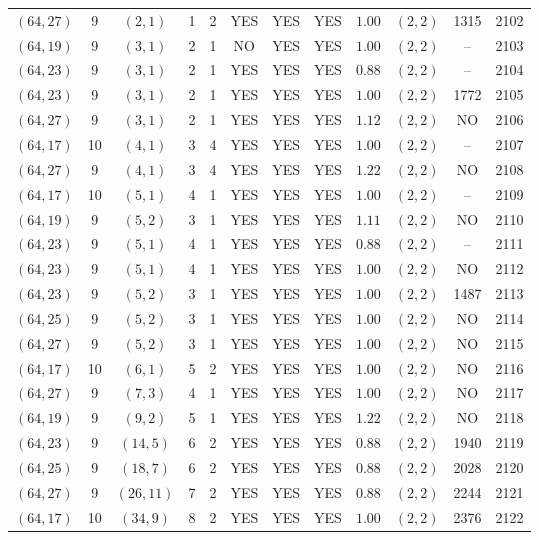 \begin{longtable}{|c|c|c|c|c|c|c|c|c|c|c|c|}
$(64,27)$ & 9 & $(2,1)$ & 1 & 2 & YES & YES & YES & $1.00$ & $(2,2)$ & 1315 & 2102\\
$(64,19)$ & 9 & $(3,1)$ & 2 & 1 & NO & YES & YES & $1.00$ & $(2,2)$ & -- & 2103\\
$(64,23)$ & 9 & $(3,1)$ & 2 & 1 & YES & YES & YES & $0.88$ & $(2,2)$ & -- & 2104\\
$(64,23)$ & 9 & $(3,1)$ & 2 & 1 & YES & YES & YES & $1.00$ & $(2,2)$ & 1772 & 2105\\
$(64,27)$ & 9 & $(3,1)$ & 2 & 1 & YES & YES & YES & $1.12$ & $(2,2)$ & NO & 2106\\
$(64,17)$ & 10 & $(4,1)$ & 3 & 4 & YES & YES & YES & $1.00$ & $(2,2)$ & -- & 2107\\
$(64,27)$ & 9 & $(4,1)$ & 3 & 4 & YES & YES & YES & $1.22$ & $(2,2)$ & NO & 2108\\
$(64,17)$ & 10 & $(5,1)$ & 4 & 1 & YES & YES & YES & $1.00$ & $(2,2)$ & -- & 2109\\
$(64,19)$ & 9 & $(5,2)$ & 3 & 1 & YES & YES & YES & $1.11$ & $(2,2)$ & NO & 2110\\
$(64,23)$ & 9 & $(5,1)$ & 4 & 1 & YES & YES & YES & $0.88$ & $(2,2)$ & -- & 2111\\
$(64,23)$ & 9 & $(5,1)$ & 4 & 1 & YES & YES & YES & $1.00$ & $(2,2)$ & NO & 2112\\
$(64,23)$ & 9 & $(5,2)$ & 3 & 1 & YES & YES & YES & $1.00$ & $(2,2)$ & 1487 & 2113\\
$(64,25)$ & 9 & $(5,2)$ & 3 & 1 & YES & YES & YES & $1.00$ & $(2,2)$ & NO & 2114\\
$(64,27)$ & 9 & $(5,2)$ & 3 & 1 & YES & YES & YES & $1.00$ & $(2,2)$ & NO & 2115\\
$(64,17)$ & 10 & $(6,1)$ & 5 & 2 & YES & YES & YES & $1.00$ & $(2,2)$ & NO & 2116\\
$(64,27)$ & 9 & $(7,3)$ & 4 & 1 & YES & YES & YES & $1.00$ & $(2,2)$ & NO & 2117\\
$(64,19)$ & 9 & $(9,2)$ & 5 & 1 & YES & YES & YES & $1.22$ & $(2,2)$ & NO & 2118\\
$(64,23)$ & 9 & $(14,5)$ & 6 & 2 & YES & YES & YES & $0.88$ & $(2,2)$ & 1940 & 2119\\
$(64,25)$ & 9 & $(18,7)$ & 6 & 2 & YES & YES & YES & $0.88$ & $(2,2)$ & 2028 & 2120\\
$(64,27)$ & 9 & $(26,11)$ & 7 & 2 & YES & YES & YES & $0.88$ & $(2,2)$ & 2244 & 2121\\
$(64,17)$ & 10 & $(34,9)$ & 8 & 2 & YES & YES & YES & $1.00$ & $(2,2)$ & 2376 & 2122\\

\end{longtable}
